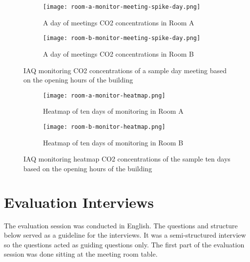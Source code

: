 \begin{appendices}
\begin{figure}[htbp]
    \centering
    \begin{subfigure}{0.48\textwidth}
        \centering
        \texttt{[image: room-a-monitor-meeting-spike-day.png]}
        \caption{A day of meetings CO2 concentrations in Room A}
        \label{fig:image1}
    \end{subfigure}
    \hfill
    \begin{subfigure}{0.48\textwidth}
        \centering
        \texttt{[image: room-b-monitor-meeting-spike-day.png]}
        \caption{A day of meetings CO2 concentrations in Room B}
        \label{fig:image2}
    \end{subfigure}
    \caption{IAQ monitoring CO2 concentrations of a sample day meeting based on the opening hours of the building}
    \label{fig:grid}
\end{figure}

\begin{figure}[htbp]
    \centering
    \begin{subfigure}{0.48\textwidth}
        \centering
        \texttt{[image: room-a-monitor-heatmap.png]}
        \caption{Heatmap of ten days of monitoring in Room A}
        \label{fig:image1}
    \end{subfigure}
    \hfill
    \begin{subfigure}{0.48\textwidth}
        \centering
        \texttt{[image: room-b-monitor-heatmap.png]}
        \caption{Heatmap of ten days of monitoring in Room B}
        \label{fig:image2}
    \end{subfigure}
    \caption{IAQ monitoring heatmap CO2 concentrations of the sample ten days based on the opening hours of the building}
    \label{fig:grid}
\end{figure}

\newpage

\section{Evaluation Interviews}
\label{appendix:evaluation}

The evaluation session was conducted in English. The questions and structure below served as a guideline for the interviews. It was a semi-structured interview so the questions acted as guiding questions only. The first part of the evaluation session was done sitting at the meeting room table.

\vspace{5pt}


\end{appendices}
